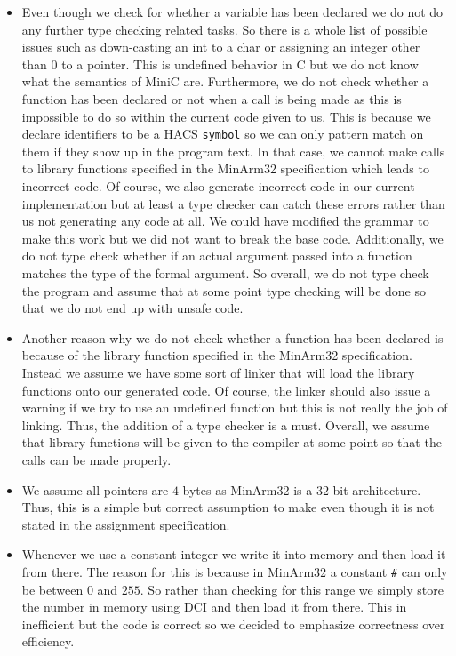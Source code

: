 \documentclass{article}
\begin{document}
\begin{itemize}
    \item Even though we check for whether a variable has been declared we do not do any further type checking related tasks. So there is a whole list of possible issues such as down-casting an int to a char or assigning an integer other than $0$ to a pointer. This is undefined behavior in C but we do not know what the semantics of MiniC are. Furthermore, we do not check whether a function has been declared or not when a call is being made as this is impossible to do so within the current code given to us. This is because we declare identifiers to be a HACS \texttt{symbol} so we can only pattern match on them if they show up in the program text. In that case, we cannot make calls to library functions specified in the MinArm32 specification which leads to incorrect code. Of course, we also generate incorrect code in our current implementation but at least a type checker can catch these errors rather than us not generating any code at all. We could have modified the grammar to make this work but we did not want to break the base code. Additionally, we do not type check whether if an actual argument passed into a function matches the type of the formal argument. So overall, we do not type check the program and assume that at some point type checking will be done so that we do not end up with unsafe code.
    \item Another reason why we do not check whether a function has been declared is because of the library function specified in the MinArm32 specification. Instead we assume we have some sort of linker that will load the library functions onto our generated code. Of course, the linker should also issue a warning if we try to use an undefined function but this is not really the job of linking. Thus, the addition of a type checker is a must. Overall, we assume that library functions will be given to the compiler at some point so that the calls can be made properly.
    \item We assume all pointers are $4$ bytes as MinArm32 is a $32$-bit architecture. Thus, this is a simple but correct assumption to make even though it is not stated in the assignment specification.
    \item Whenever we use a constant integer we write it into memory and then load it from there. The reason for this is because in MinArm32 a constant \texttt{\#} can only be between $0$ and $255$. So rather than checking for this range we simply store the number in memory using DCI and then load it from there. This in inefficient but the code is correct so we decided to emphasize correctness over efficiency.

\end{itemize}
\end{document}
